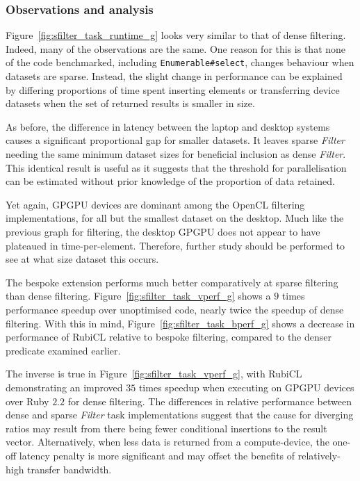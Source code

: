 \subsubsection{Observations and analysis}
Figure~\ref{fig:sfilter_task_runtime_g} looks very similar to that of dense filtering. Indeed, many of the observations are the same.
One reason for this is that none of the code benchmarked, including \verb|Enumerable#select|, changes behaviour when datasets are sparse.
Instead, the slight change in performance can be explained by differing proportions of time spent inserting elements or transferring device datasets when the set of returned results is smaller in size.

As before, the difference in latency between the laptop and desktop systems causes a significant proportional gap for smaller datasets.
It leaves sparse \emph{Filter} needing the same minimum dataset sizes for beneficial inclusion as dense \emph{Filter}.
This identical result is useful as it suggests that the threshold for parallelisation can be estimated without prior knowledge of the proportion of data retained.

Yet again, \ac{GPGPU} devices are dominant among the \ac{OpenCL} filtering implementations, for all but the smallest dataset on the desktop.
Much like the previous graph for filtering, the desktop \ac{GPGPU} does not appear to have plateaued in time-per-element. Therefore, further study should be performed to see at what size dataset this occurs.

The bespoke extension performs much better comparatively at sparse filtering than dense filtering. Figure~\ref{fig:sfilter_task_vperf_g} shows a $9$ times performance speedup over unoptimised code, nearly twice the speedup of dense filtering.
With this in mind, Figure~\ref{fig:sfilter_task_bperf_g} shows a decrease in performance of RubiCL relative to bespoke filtering, compared to the denser predicate examined earlier.

The inverse is true in Figure~\ref{fig:sfilter_task_vperf_g}, with RubiCL demonstrating an improved $3$\textendash$5$ times speedup when executing on \ac{GPGPU} devices over Ruby $2.2$ for dense filtering.
The differences in relative performance between dense and sparse \emph{Filter} task implementations suggest that the cause for diverging ratios may result from there being fewer conditional insertions to the result vector. Alternatively, when less data is returned from a compute-device, the one-off latency penalty is more significant and may offset the benefits of relatively-high transfer bandwidth.

